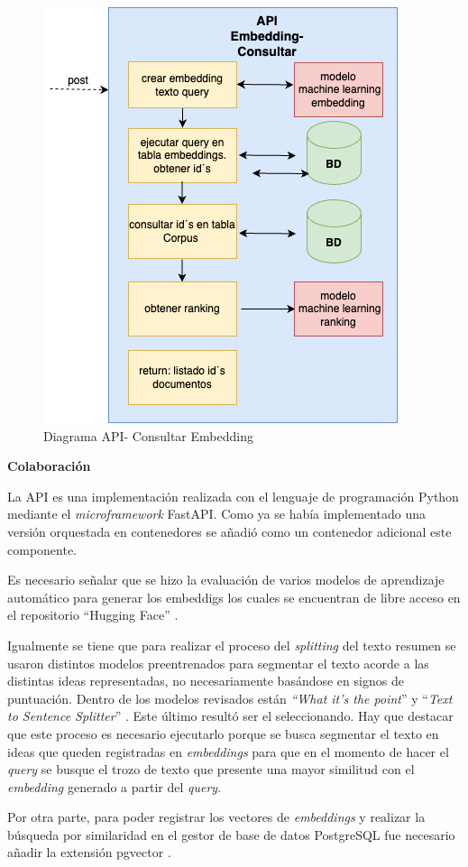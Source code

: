 \documentclass[
  12pt,
  openany]{book}
\begin{document}
\begin{enumerate}
\begin{figure}
  {\centering \includegraphics[width=0.45\linewidth]{images/05-desarrollo/5_ciclo/diagramapiconsultar} 

  }

  \caption{Diagrama API- Consultar Embedding}\label{fig:semanticoconsultar}
  \end{figure}
\end{enumerate}

\textbf{Colaboración}

La API es una implementación realizada con el lenguaje de programación Python mediante el \emph{microframework} FastAPI. Como ya se había implementado una versión orquestada en contenedores se añadió como un contenedor adicional este componente.

Es necesario señalar que se hizo la evaluación de varios modelos de aprendizaje automático para generar los embeddigs los cuales se encuentran de libre acceso en el repositorio ``Hugging Face'' \citep{hfmodels2023}.

Igualmente se tiene que para realizar el proceso del \emph{splitting} del texto resumen se usaron distintos modelos preentrenados para segmentar el texto acorde a las distintas ideas representadas, no necesariamente basándose en signos de puntuación. Dentro de los modelos revisados están \emph{``What it's the point}'' \citep{minixhofer-etal-2023-wheres} y ``\emph{Text to Sentence Splitter}'' \citep{sensplit22023}. Este último resultó ser el seleccionando. Hay que destacar que este proceso es necesario ejecutarlo porque se busca segmentar el texto en ideas que queden registradas en \emph{embeddings} para que en el momento de hacer el \emph{query} se busque el trozo de texto que presente una mayor similitud con el \emph{embedding} generado a partir del \emph{query}.

Por otra parte, para poder registrar los vectores de \emph{embeddings} y realizar la búsqueda por similaridad en el gestor de base de datos PostgreSQL fue necesario añadir la extensión pgvector \citep{pgvector2023}.
\end{document}
